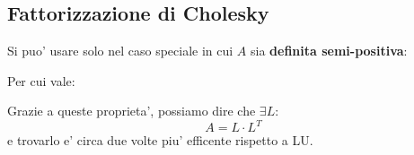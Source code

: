 \subsection{Fattorizzazione di Cholesky}
Si puo' usare solo nel caso speciale in cui $ A $ sia \textbf{definita semi-positiva}:

Per cui vale:

Grazie a queste proprieta', possiamo dire che $ \exists L: $
\[
A = L \cdot L^T
\]
e trovarlo e' circa due volte piu' efficente rispetto a LU.



